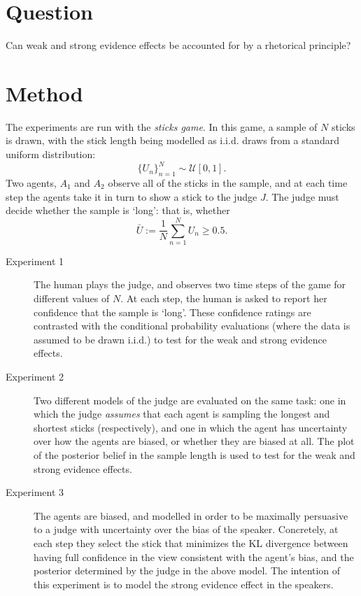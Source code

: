 \documentclass{article}
\begin{document}
\section{Question}
Can weak and strong evidence effects be accounted for by a rhetorical principle?

\section{Method}

The experiments are run with the \textit{sticks game}. In this game, a sample of $N$ sticks is drawn, with the stick length being modelled as i.i.d. draws from a standard uniform distribution: \[ \{ U_n\}_{n=1}^N \sim \mathcal{U}[0, 1] .\] Two agents, $A_1$ and $A_2$ observe all of the sticks in the sample, and at each time step the agents take it in turn to show a stick to the judge $J$. The judge must decide whether the sample is `long': that is, whether \[ \bar{U} := \frac{1}{N} \sum_{n=1}^N U_n \ge 0.5 .\]

\begin{description}
\item[Experiment 1] The human plays the judge, and observes two time steps of the game for different values of $N$. At each step, the human is asked to report her confidence that the sample is `long'. These confidence ratings are contrasted with the conditional probability evaluations (where the data is assumed to be drawn i.i.d.) to test for the weak and strong evidence effects.

\item[Experiment 2] Two different models of the judge are evaluated on the same task: one in which the judge \textit{assumes} that each agent is sampling the longest and shortest sticks (respectively), and one in which the agent has uncertainty over how the agents are biased, or whether they are biased at all. The plot of the posterior belief in the sample length is used to test for the weak and strong evidence effects.

 \item[Experiment 3] The agents are biased, and modelled in order to be maximally persuasive to a judge with uncertainty over the bias of the speaker. Concretely, at each step they select the stick that minimizes the KL divergence between having full confidence in the view consistent with the agent's bias, and the posterior determined by the judge in the above model. The intention of this experiment is to model the strong evidence effect in the speakers.
\end{description}

\printbibliography
\end{document}
